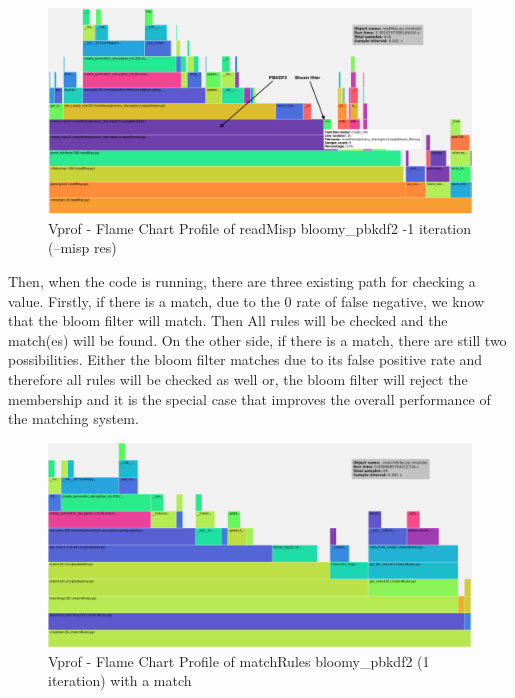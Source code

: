 \documentclass{eplmastersthesis}
\begin{document}
\begin{figure}[h!]
\begin{center}
	\includegraphics[scale=0.3]{res/readMisp-bloomy-1iter-res}
	\caption{Vprof - Flame Chart Profile of readMisp bloomy\_pbkdf2 -1 iteration (--misp res)}
	\label{profile-bloomy-readMisp-1iter}
\end{center}
\end{figure}


Then, when the code is running, there are three existing path for checking a value. Firstly, if there is a match, due to the 0 rate of false negative, we know that the bloom filter will match. Then All rules will be checked and the match(es) will be found. On the other side, if there is a match, there are still two possibilities. Either the bloom filter matches due to its false positive rate and therefore all rules will be checked as well or, the bloom filter will reject the membership and it is the special case that improves the overall performance of the matching system.\\


\begin{figure}[h!]
\begin{center}
	\includegraphics[scale=0.3]{res/match-exist}
	\caption{Vprof - Flame Chart Profile of matchRules bloomy\_pbkdf2 (1 iteration) with a match}
	\label{profile-bloomy-match}
\end{center}
\end{figure}
\end{document}

